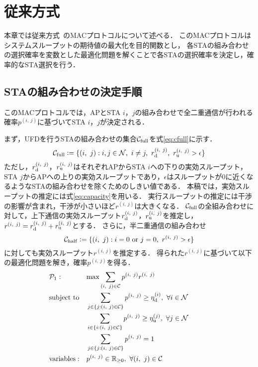 \documentclass[technicalreport]{ieicej}
\newcommand{\sij}{(i,\ j)}
\newcommand{\pij}{p^{(i,\ j)}}
\newcommand{\rd}{r^{\sij}_{\rm d}}
\newcommand{\ru}{r^{\sij}_{\rm u}}
\newcommand{\rij}{r^{\sij}}
\def\coloneqq{\mathrel{\mathop:}=}
\begin{document}
\section{従来方式}
	本章では従来方式~\cite{promac}のMACプロトコルについて述べる．
	このMACプロトコルはシステムスループットの期待値の最大化を目的関数とし，
	各STAの組み合わせの選択確率を変数とした最適化問題を解くことで各STAの選択確率を決定し，確率的なSTA選択を行う．
	\subsection{STAの組み合わせの決定手順}\label{sec:promac}
		このMACプロトコルでは，APとSTA $i$，$j$の組み合わせで全二重通信が行われる確率$\pij$に基づいてSTA $i$，$j$が決定される．
		\par
		まず，UFDを行うSTAの組み合わせの集合${\mathcal C}_{\rm full}$を式\eqref{eq:cfull}に示す．
		\begin{equation}
			{\mathcal C}_{\rm full} \coloneqq \{\sij : i,j\in{\mathcal N},\ i\neq j,\ r^{\sij}_{\rm d},\ r^{\sij}_{\rm u}>\epsilon\} \label{eq:cfull}
		\end{equation}
		ただし，$r_{\rm d}^{\sij}$，$r_{\rm u}^{\sij}$はそれぞれAPからSTA $i$への下りの実効スループット，
		STA $j$からAPへの上りの実効スループットであり，$\epsilon$はスループットが0に近くなるようなSTAの組み合わせを除くためのしきい値である．
		本稿では，実効スループットの推定には式\eqref{eq:capacity}を用いる．
		実行スループットの推定には干渉の影響が含まれ，干渉が小さいほど$\rij$は大きくなる．
		${\mathcal C}_{\rm full}$の全組み合わせに対して，上下通信の実効スループット$\rd$，$\ru$を推定し，$\rij=\rd + \ru$とする．
		さらに，半二重通信の組み合わせ
		\begin{equation}
			{\mathcal C}_{\rm half} \coloneqq \{\sij : i=0\ {\rm or}\ j=0,\ \rij >\epsilon\}
		\end{equation}
		に対しても実効スループット$\rij$を推定する．
		得られた$\rij$に基づいて以下の最適化問題を解き，確率$\pij$を得る．
		\begin{align}
			&{\mathcal P}_1: && {\rm max} \sum_{(i,\ j)\in{\mathcal C}} p^{(i,\ j)}r^{(i,\ j)} &&&&&& \label{eq:p1}\\
			&{\rm subject\ to} && \sum_{j\in\{j:(i,\ j)\in{\mathcal C}\}} p^{(i,\ j)} \geq \eta_{\rm d}^{(i)},\ \forall i\in {\mathcal N}  \\
			&&& \sum_{i\in\{i:(i,\ j)\in{\mathcal C}\}} p^{(i,\ j)} \geq \eta_{\rm u}^{(j)},\ \forall j\in {\mathcal N} \label{eq:pu}\\
			&&& \sum_{j\in\{j:(i,\ j)\in{\mathcal C}\}} p^{(i,\ j)}=1 \\
			&{\rm variables:} &&p^{(i,\ j)} \in {\mathbb R}_{\geq 0},\ \forall(i,\ j)\in {\mathcal C} \nonumber
		\end{align}
\end{document}

